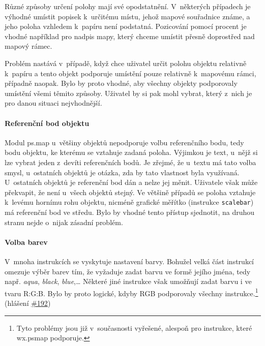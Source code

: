 \documentclass[a4paper,12pt,draft]{article}
\newcommand{\instr}[1]{\lstinline[style=psmapInline]|#1|}
\begin{document}
Různé způsoby určení polohy mají své opodstatnění. V~některých
případech je výhodné umístit popisek k~určitému místu, jehož
mapové souřadnice známe, a jeho poloha vzhledem k~papíru není
podstatná. Pozicování pomocí procent je vhodné například pro nadpis
mapy, který chceme umístit přesně doprostřed nad mapový rámec.

Problém nastává v~případě, když chce uživatel určit polohu objektu
relativně k~papíru a tento objekt podporuje umístění pouze relativně
k~mapovému rámci, případně naopak. Bylo by proto vhodné, aby všechny
objekty podporovaly umístění všemi těmito způsoby. Uživatel by si
pak mohl vybrat, který z~nich je pro danou situaci nejvhodnější.


\paragraph*{Referenční bod objektu}
\label{sec:psmap:referencepoint}
Modul ps.map u~většiny objektů nepodporuje volbu referenčního
bodu, tedy bodu objektu, ke kterému se vztahuje zadaná poloha. Výjim\-kou
je text, u~nějž si lze vybrat jeden z~devíti referenčních bodů. Je
zřejmé, že u~textu má tato volba smysl, u~ostatních objektů je otázka,
zda by tato vlastnost byla využívaná.
U~ostatních objektů je referenční bod dán a nelze jej měnit. Uživatele
však může překvapit, že není u~všech objektů stejný. Ve většině
případů se poloha vztahuje k~levému hornímu rohu objektu, nicméně
grafické měřítko (instrukce \instr{scalebar}) má referenční bod ve
středu. Bylo by vhodné tento přístup sjednotit, na druhou stranu nejde
o~nijak zásadní problém.


\paragraph*{Volba barev}
\label{sec:psmap:color}
V~mnoha instrukcích se vyskytuje nastavení barvy. Bohužel velká část
instrukcí omezuje výběr barev tím, že vyžaduje zadat barvu ve formě
jejího jména, tedy např. \emph{aqua}, \emph{black}, \emph{blue},\ldots 
Některé jiné instrukce však umožňují zadat barvu i ve tvaru R:G:B. Bylo
by proto logické, kdyby RGB podporovaly všechny instrukce.\footnote{Tyto
problémy jsou již v~současnosti vyřešené, alespoň pro instrukce,
které wx.psmap podporuje.}
(hlášení \href{https://trac.osgeo.org/grass/ticket/192}{\#192})
\end{document}
